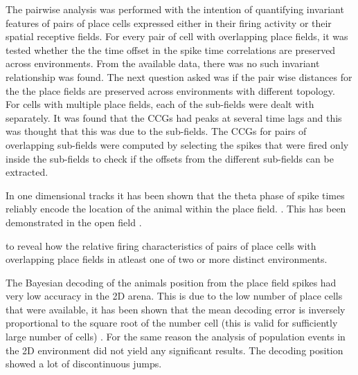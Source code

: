 The pairwise analysis was performed with the intention of quantifying invariant features of pairs of place cells expressed either in their firing activity or their spatial receptive fields. For every pair of cell with overlapping place fields, it was tested whether the the time offset in the spike time correlations are preserved across environments. From the available data, there was no such invariant relationship was found. The next question asked was if the pair wise distances for the the place fields are preserved across environments with different topology.\\
For cells with multiple place fields, each of the sub-fields were dealt with separately. It was found that the CCGs had peaks at several time lags and this was thought that this was due to the sub-fields. The CCGs for pairs of overlapping sub-fields were computed by selecting the spikes that were fired only inside the sub-fields to check if the offsets from the different sub-fields can be extracted. 

In one dimensional tracks it has been shown that the theta phase of spike times reliably encode the location of the animal within the place field. \cite{O'Keefe1993, Skaggs1996c, Huxter2003}. This has been demonstrated in the open field \cite{Huxter2008a}. 

to reveal how the relative firing characteristics of pairs of place cells with overlapping place fields in atleast one of  two or more distinct environments.  



The Bayesian decoding of the animals position from the place field spikes had very low accuracy in the 2D arena. This is due to the low number of place cells that were available, it has been shown that the mean decoding error is inversely proportional to the square root of the number cell (this is valid for sufficiently large number of cells) \cite{Zhang2013}. For the same reason the analysis of population events in the 2D environment did not yield any significant results. The decoding position showed a lot of discontinuous jumps.\\

